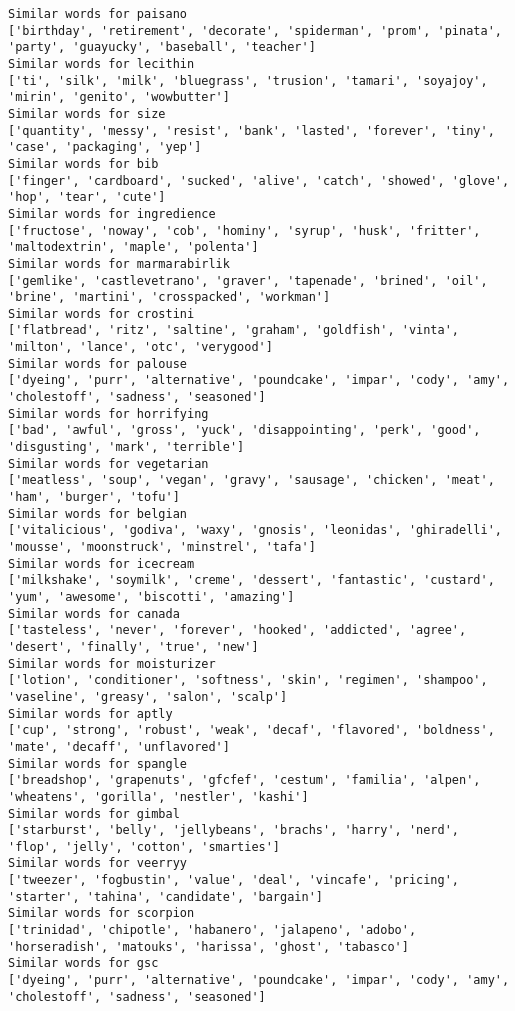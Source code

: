 \documentclass[11pt]{article}
\begin{document}
\begin{Verbatim}[commandchars=\\\{\}]
Similar words for paisano
['birthday', 'retirement', 'decorate', 'spiderman', 'prom', 'pinata', 'party', 'guayucky', 'baseball', 'teacher']
Similar words for lecithin
['ti', 'silk', 'milk', 'bluegrass', 'trusion', 'tamari', 'soyajoy', 'mirin', 'genito', 'wowbutter']
Similar words for size
['quantity', 'messy', 'resist', 'bank', 'lasted', 'forever', 'tiny', 'case', 'packaging', 'yep']
Similar words for bib
['finger', 'cardboard', 'sucked', 'alive', 'catch', 'showed', 'glove', 'hop', 'tear', 'cute']
Similar words for ingredience
['fructose', 'noway', 'cob', 'hominy', 'syrup', 'husk', 'fritter', 'maltodextrin', 'maple', 'polenta']
Similar words for marmarabirlik
['gemlike', 'castlevetrano', 'graver', 'tapenade', 'brined', 'oil', 'brine', 'martini', 'crosspacked', 'workman']
Similar words for crostini
['flatbread', 'ritz', 'saltine', 'graham', 'goldfish', 'vinta', 'milton', 'lance', 'otc', 'verygood']
Similar words for palouse
['dyeing', 'purr', 'alternative', 'poundcake', 'impar', 'cody', 'amy', 'cholestoff', 'sadness', 'seasoned']
Similar words for horrifying
['bad', 'awful', 'gross', 'yuck', 'disappointing', 'perk', 'good', 'disgusting', 'mark', 'terrible']
Similar words for vegetarian
['meatless', 'soup', 'vegan', 'gravy', 'sausage', 'chicken', 'meat', 'ham', 'burger', 'tofu']
Similar words for belgian
['vitalicious', 'godiva', 'waxy', 'gnosis', 'leonidas', 'ghiradelli', 'mousse', 'moonstruck', 'minstrel', 'tafa']
Similar words for icecream
['milkshake', 'soymilk', 'creme', 'dessert', 'fantastic', 'custard', 'yum', 'awesome', 'biscotti', 'amazing']
Similar words for canada
['tasteless', 'never', 'forever', 'hooked', 'addicted', 'agree', 'desert', 'finally', 'true', 'new']
Similar words for moisturizer
['lotion', 'conditioner', 'softness', 'skin', 'regimen', 'shampoo', 'vaseline', 'greasy', 'salon', 'scalp']
Similar words for aptly
['cup', 'strong', 'robust', 'weak', 'decaf', 'flavored', 'boldness', 'mate', 'decaff', 'unflavored']
Similar words for spangle
['breadshop', 'grapenuts', 'gfcfef', 'cestum', 'familia', 'alpen', 'wheatens', 'gorilla', 'nestler', 'kashi']
Similar words for gimbal
['starburst', 'belly', 'jellybeans', 'brachs', 'harry', 'nerd', 'flop', 'jelly', 'cotton', 'smarties']
Similar words for veerryy
['tweezer', 'fogbustin', 'value', 'deal', 'vincafe', 'pricing', 'starter', 'tahina', 'candidate', 'bargain']
Similar words for scorpion
['trinidad', 'chipotle', 'habanero', 'jalapeno', 'adobo', 'horseradish', 'matouks', 'harissa', 'ghost', 'tabasco']
Similar words for gsc
['dyeing', 'purr', 'alternative', 'poundcake', 'impar', 'cody', 'amy', 'cholestoff', 'sadness', 'seasoned']

\end{Verbatim}
\end{document}
